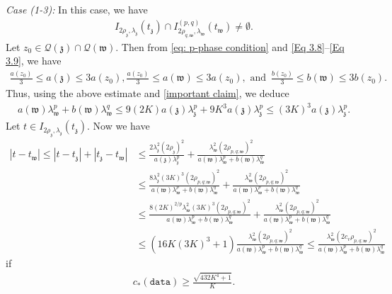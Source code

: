 \documentclass[11pt,oneside, english,reqno,twoside a4paper]{amsart}
\theoremstyle{definition}
\numberwithin{theorem}{section}
\numberwithin{equation}{section}
\newcommand{\mfz}{\mathfrak{z}}
\newcommand{\mfw}{\mathfrak{w}}
\begin{document}
\noindent \textit{Case (1-3):} In this case, we have
\begin{align*}
    I_{2\rho_{\mathfrak{z}}, \lambda_{\mathfrak{z}}}(t_{\mathfrak{z}})\cap I^{(p,q)}_{2\rho_{q, \mathfrak{w}}, \lambda_{\mathfrak{w}}}(t_{\mathfrak{w}})\neq \emptyset.
\end{align*}
Let $z_0\in \mathcal{Q}(\mfz)\cap \mathcal{Q}(\mfw).$ Then from \eqref{eq: p-phase condition}
 and \eqref{Eq 3.8}--\eqref{Eq 3.9}, we have
 \begin{align*}
     \frac{a(z_0)}{3}\leq a(\mfz)\leq 3a(z_0), \frac{a(z_0)}{3}\leq a(\mfw)\leq 3a(z_0),\,\, \text{and}\,\,\, \frac{b(z_0)}{3}\leq b(\mfw)\leq 3b(z_0).
 \end{align*}
 Thus, using the above estimate and \eqref{important claim}, we deduce
 \begin{align*}
a(\mathfrak{w})\lambda^p_{\mathfrak{w}}+b(\mathfrak{w})\lambda^q_{\mathfrak{w}}\leq 9(2K)a(\mfz)\lambda^p_{\mfz}+9K^3 a(\mfz)\lambda^p_{\mfz}\leq (3K)^3 a(\mfz)\lambda^p_{\mfz}.   
 \end{align*}
Let $t \in I_{2\rho_{\mathfrak{z}}, \lambda_{\mathfrak{z}}}(t_{\mathfrak{z}}).$ Now we have
\begin{align*}
 |t-t_{\mathfrak{w}}|\leq |t-t_{\mathfrak{z}}|+|t_{\mathfrak{z}}-t_{\mathfrak{w}}|&\leq \frac{2\lambda^{2}_{\mathfrak{z}}(2\rho_{\mathfrak{z}})^2}{a(\mathfrak{z})\lambda^p_{\mfz}}+\frac{\lambda^2_{\mathfrak{w}}(2\rho_{p,q; \mathfrak{w}})^2}{a(\mathfrak{w})\lambda^p_{\mathfrak{w}}+b(\mathfrak{w})\lambda^q_{\mathfrak{w}}}\\
 &\leq \frac{8\lambda^2_{\mfz}(3K)^3(2\rho_{p,q;\mfw})^2}{a(\mathfrak{w})\lambda^p_{\mathfrak{w}}+b(\mathfrak{w})\lambda^q_{\mathfrak{w}}}+\frac{\lambda^2_{\mathfrak{w}}(2\rho_{p,q; \mathfrak{w}})^2}{a(\mathfrak{w})\lambda^p_{\mathfrak{w}}+b(\mathfrak{w})\lambda^q_{\mathfrak{w}}}\\
 &\leq \frac{8(2K)^{2/p}\lambda^2_{\mfw}(3K)^3(2\rho_{p,q;\mfw})^2}{a(\mathfrak{w})\lambda^p_{\mathfrak{w}}+b(\mathfrak{w})\lambda^q_{\mathfrak{w}}}+\frac{\lambda^2_{\mathfrak{w}}(2\rho_{p,q; \mathfrak{w}})^2}{a(\mathfrak{w})\lambda^p_{\mathfrak{w}}+b(\mathfrak{w})\lambda^q_{\mathfrak{w}}}\\
 &\leq \left(16K(3K)^3+1\right)\frac{\lambda^2_{\mathfrak{w}}(2\rho_{p,q; \mathfrak{w}})^2}{a(\mathfrak{w})\lambda^p_{\mathfrak{w}}+b(\mathfrak{w})\lambda^q_{\mathfrak{w}}}\leq \frac{\lambda^2_{\mathfrak{w}}(2c_v\rho_{p,q; \mathfrak{w}})^2}{a(\mathfrak{w})\lambda^p_{\mathfrak{w}}+b(\mathfrak{w})\lambda^q_{\mathfrak{w}}}
\end{align*}
if 
\begin{align}\label{c_3}c_*(\texttt{data})\geq \frac{\sqrt{432K^4+1}}{K}.\end{align}
\end{document}
